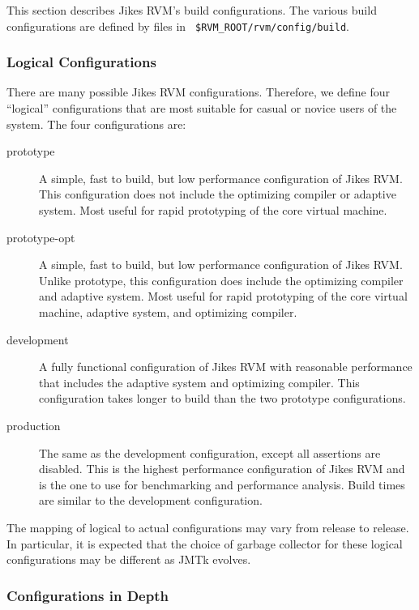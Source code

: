 This section describes Jikes\TMweb{} RVM's build configurations.
The various build configurations are defined by files in {\tt
\$RVM\_ROOT/rvm/config/build}.

\subsubsection{Logical Configurations}%
There are many possible Jikes RVM configurations.
Therefore, we define four ``logical'' configurations that are most
suitable for casual or novice users of the system.  The four
configurations are: 
\begin{description}

\item[prototype] A simple, fast to build, but low performance
configuration of Jikes RVM.  This configuration does not include the
optimizing compiler or adaptive system.  Most useful for rapid
prototyping of the core virtual machine.

\item[prototype-opt] A simple, fast to build, but low performance
configuration of Jikes RVM.  Unlike prototype, this configuration does
include the optimizing compiler and adaptive system. Most useful for
rapid prototyping of the core virtual machine, adaptive system, and
optimizing compiler. 

\item[development] A fully functional configuration of
Jikes RVM with reasonable performance that includes the adaptive
system and optimizing compiler. This configuration takes longer to
build than the two prototype configurations.

\item[production] The same as the development configuration,
except all assertions are disabled.  This is the highest performance
configuration of Jikes RVM and is the one to use for benchmarking and
performance analysis. Build times are similar to the development
configuration. 

\end{description}

The mapping of logical to actual configurations may vary from release
to release.  In particular, it is expected that the choice of garbage
collector for these logical configurations may be different as JMTk
evolves. 

\subsubsection{Configurations in Depth}

